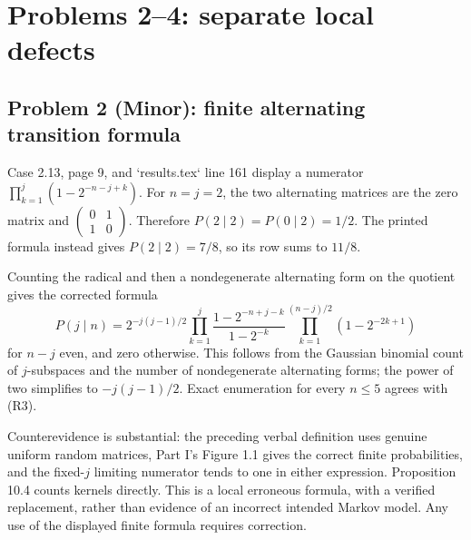 \documentclass[10pt]{article}
\begin{document}
\section*{Problems 2–4: separate local defects}
\subsection*{Problem 2 (Minor): finite alternating transition formula}
Case 2.13, page 9, and `results.tex` line 161 display a numerator \(\prod_{k=1}^{j}(1-2^{-n-j+k})\). For \(n=j=2\), the two alternating matrices are the zero matrix and \(\left(\begin{smallmatrix}0&1\\1&0\end{smallmatrix}\right)\). Therefore \(P(2\mid2)=P(0\mid2)=1/2\). The printed formula instead gives \(P(2\mid2)=7/8\), so its row sums to \(11/8\).\par
Counting the radical and then a nondegenerate alternating form on the quotient gives the corrected formula \[P(j\mid n)=2^{-j(j-1)/2}
 \prod_{k=1}^{j}\frac{1-2^{-n+j-k}}{1-2^{-k}}
 \prod_{k=1}^{(n-j)/2}(1-2^{-2k+1})
 \tag{R3}\] for \(n-j\) even, and zero otherwise. This follows from the Gaussian binomial count of \(j\)-subspaces and the number of nondegenerate alternating forms; the power of two simplifies to \(-j(j-1)/2\). Exact enumeration for every \(n\le5\) agrees with (R3).\par
Counterevidence is substantial: the preceding verbal definition uses genuine uniform random matrices, Part I’s Figure 1.1 gives the correct finite probabilities, and the fixed-\(j\) limiting numerator tends to one in either expression. Proposition 10.4 counts kernels directly. This is a local erroneous formula, with a verified replacement, rather than evidence of an incorrect intended Markov model. Any use of the displayed finite formula requires correction.\par
\end{document}
